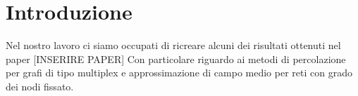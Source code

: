 \section{Introduzione}\label{sec:introduzione}
Nel nostro lavoro ci siamo occupati di ricreare alcuni dei risultati ottenuti nel paper [INSERIRE PAPER]
Con particolare riguardo ai metodi di percolazione per grafi di tipo multiplex e approssimazione di 
campo medio per reti con grado dei nodi fissato.